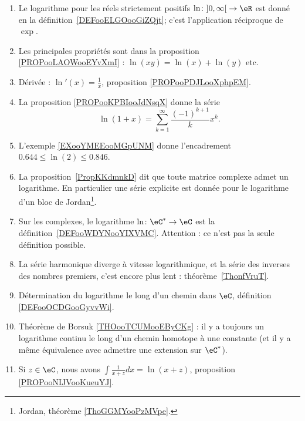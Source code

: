 
\begin{enumerate}
	\item
	      Le logarithme pour les réels strictement positifs \( \ln\colon \mathopen] 0 , \infty \mathclose[\to \eR\) est donné en la définition~\ref{DEFooELGOooGiZQjt}; c'est l'application réciproque de \( \exp\).
	\item
	      Les principales propriétés sont dans la proposition \ref{PROPooLAOWooEYvXmI} : \( \ln(xy)=\ln(x)+\ln(y)\) etc.
	\item
	      Dérivée : \( \ln'(x)=\frac{1}{ x }\), proposition \ref{PROPooPDJLooXphpEM}.
	\item
	      La proposition \ref{PROPooKPBIooJdNsqX} donne la série
	      \begin{equation}
		      \ln(1+x)=\sum_{k=1}^{\infty}\frac{ (-1)^{k+1} }{ k }x^k.
	      \end{equation}
	\item
	      L'exemple \ref{EXooYMEEooMGpUNM} donne l'encadrement \( 0.644\leq \ln(2)\leq 0.846\).
	\item
	      La proposition~\ref{PropKKdmnkD} dit que toute matrice complexe admet un logarithme. En particulier une série explicite est donnée pour le logarithme d'un bloc de Jordan\footnote{Jordan, théorème \ref{ThoGGMYooPzMVpe}.}.
	\item
	      Sur les complexes, le logarithme \( \ln \colon \eC^*\to \eC\) est la définition~\ref{DEFooWDYNooYIXVMC}. Attention : ce n'est pas la seule définition possible.
	\item
	      La série harmonique diverge à vitesse logarithmique, et la série des inverses des nombres premiers, c'est encore plus lent : théorème~\ref{ThonfVruT}.
      \item
          Détermination du logarithme le long d'un chemin dans \( \eC\), définition \ref{DEFooOCDGooGyvvWi}.
      \item
          Théorème de Borsuk \ref{THOooTCUMooEByCKg} : il y a toujours un logarithme continu le long d'un chemin homotope à une constante (et il y a même équivalence avec admettre une extension sur \( \eC^*\)).
      \item
          Si \( z\in \eC\), nous avons $\int\frac{1}{ x+z }dx=\ln(x+z)$, proposition \ref{PROPooNIJVooKueuYJ}.
\end{enumerate}

